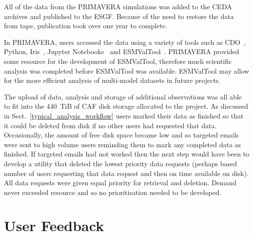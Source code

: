 \documentclass[gmd, manuscript]{copernicus}
\begin{document}
All of the data from the PRIMAVERA simulations was added to the CEDA archives and published to the ESGF. Because of the need to restore the data from tape, publication took over one year to complete.

In PRIMAVERA, users accessed the data using a variety of tools such as CDO~\citep{schulzweida_uwe_2022_7112925}, Python, Iris~\citep{Iris}, Jupyter Notebooks~\citep{Kluyver2016jupyter} and ESMValTool~\citep{Righi2020}. PRIMAVERA provided some resource for the development of ESMValTool, therefore much scientific analysis was completed before ESMValTool was available. ESMValTool may allow for the more efficient analysis of multi-model datasets in future projects.

The upload of data, analysis and storage of additional observations was all able to fit into the 440~TiB of CAF disk storage allocated to the project. As discussed in Sect.~\ref{typical_analysis_workflow} users marked their data as finished so that it could be deleted from disk if no other users had requested that data. Occasionally, the amount of free disk space became low and so targeted emails were sent to high volume users reminding them to mark any completed data as finished. If targeted emails had not worked then the next step would have been to develop a utility that deleted the lowest priority data requests (perhaps based number of users requesting that data request and then on time available on disk). All data requests were given equal priority for retrieval and deletion. Demand never exceeded resource and so no prioritisation needed to be developed.

\section{User Feedback}
\end{document}
